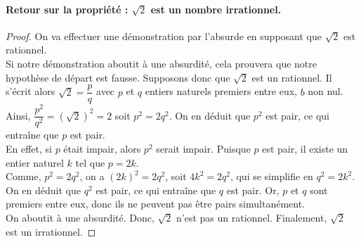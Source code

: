 \paragraph{Retour sur la propriété : $\sqrt{2}$ est un nombre irrationnel.}
\begin{proof}
On va effectuer une démonstration par l'absurde en supposant que $\sqrt{2}$ est rationnel. \\Si notre démonstration aboutit à une absurdité, cela prouvera que notre hypothèse de départ est fausse.
Supposons donc que $\sqrt{2}$ est un rationnel.
Il s'écrit alors $\sqrt{2}=\dfrac{p}{q}$ avec $p$ et $q$ entiers naturels premiers entre eux, $b$ non nul.\\
Ainsi, $\dfrac{p^2}{q^2}=\left(\sqrt{2}\right)^2=2$ soit $p^2=2q^2$.
On en déduit que $p^2$ est pair, ce qui entraîne que $p$ est pair.
\\En effet, si $p$ était impair, alors $p^2$ serait impair.
Puisque $p$ est pair, il existe un entier naturel $k$ tel que $p = 2k$. \\Comme, $p^2=2q^2$, on a $(2k)^2=2q^2$, soit $4k^2=2q^2$, qui se simplifie en $q^2=2k^2$. On en déduit que $q^2$ est pair, ce qui entraîne que $q$ est pair. Or, $p$ et $q$ sont premiers entre eux, donc ils ne peuvent pas être pairs simultanément. \\On aboutit à une absurdité. Donc, $\sqrt{2}$ n'est pas un rationnel. Finalement, $\sqrt{2}$ est un irrationnel.
\end{proof}

\bigskip

\newpage

